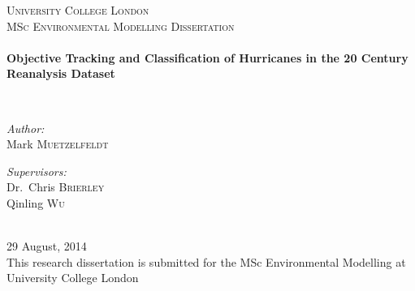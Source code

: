 \begin{titlepage}

\begin{center}

\textsc{\LARGE University College London}\\[1.5cm]

\textsc{\Large MSc Environmental Modelling Dissertation}\\[0.5cm]

\HRule \\[0.4cm]
{ \LARGE \bfseries Objective Tracking and Classification of Hurricanes in the 20 Century Reanalysis Dataset \\[0.4cm] }

\HRule \\[1.5cm]

\begin{minipage}{0.4\textwidth}
\begin{flushleft} \large
\emph{Author:}\\
Mark \textsc{Muetzelfeldt}
\end{flushleft}
\end{minipage}
\begin{minipage}{0.4\textwidth}
\begin{flushright} \large
\emph{Supervisors:} \\
Dr.~Chris \textsc{Brierley} \\
Qinling \textsc{Wu}
\end{flushright}
\end{minipage}
\\[0.5cm]
29 August, 2014
\\[0.5cm]

This research dissertation is submitted for the MSc Environmental Modelling at University College London


\vfill

\end{center}

\end{titlepage}
